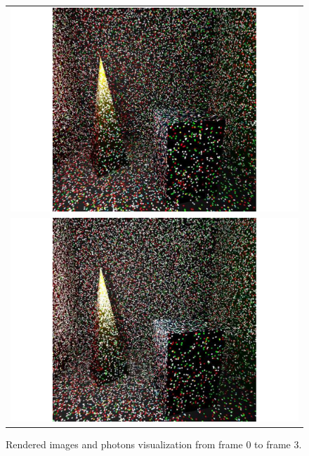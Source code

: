 \begin{figure}
\begin{center}
{\begin{tabular}{c}
\includegraphics*[scale=0.2]{imgs/pqv_frame2.pdf}\\
\includegraphics*[scale=0.2]{imgs/pqv_frame3.pdf}
\end{tabular}
}%
\renewcommand{\thefigure}{\thechapter.\arabic{figure}}
\caption[Rendered images and photons visualization from frame 0 to frame 3]{Rendered images and photons visualization from frame 0 to frame 3.}
\label{fig:result_images1}
\end{center}
\end{figure}

